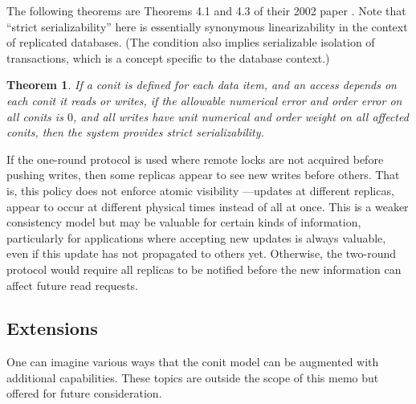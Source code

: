 \documentclass[]             %
{NASA}                       %
\newtheorem{theorem}{Theorem}[section]
\theoremstyle{definition}
\begin{document}
The following theorems are Theorems 4.1 and 4.3 of their 2002 paper
\cite{2002tact}. Note that ``strict serializability'' here is
essentially synonymous linearizability in the context of replicated
databases. (The condition also implies serializable isolation of
transactions, which is a concept specific to the database context.)
\begin{theorem}
  \label{thm:conit-correct-linearizability}
  If a conit is defined for each data item, and an access depends on
  each conit it reads or writes, if the allowable numerical error and
  order error on all conits is $0$, and all writes have unit numerical
  and order weight on all affected conits, then the system provides
  strict serializability.
\end{theorem}

If the one-round protocol is used where remote locks are not acquired
before pushing writes, then some replicas appear to see new writes
before others. That is, this policy does not enforce atomic visibility
---updates at different replicas, appear to occur at different
physical times instead of all at once. This is a weaker consistency
model but may be valuable for certain kinds of information,
particularly for applications where accepting new updates is
always valuable, even if this update has not propagated to others
yet. Otherwise, the two-round protocol would require all replicas to
be notified before the new information can affect future read
requests.

\subsection{Extensions}
\label{ssec:conit-extensions}
One can imagine various ways that the conit model can be augmented
with additional capabilities. These topics are outside the scope of
this memo but offered for future consideration.
\end{document}
